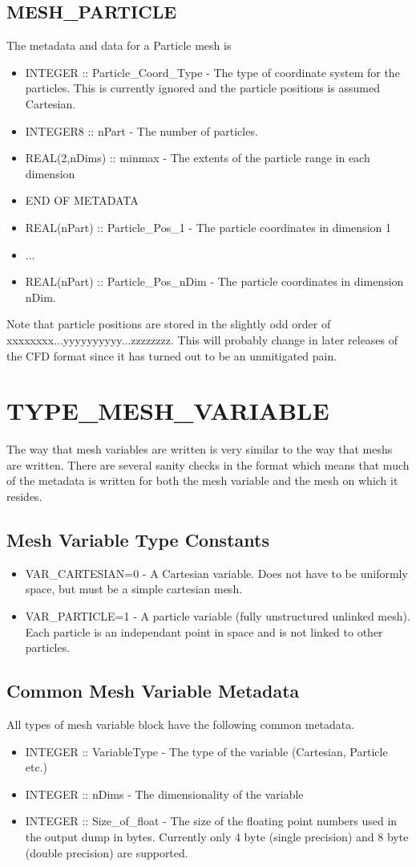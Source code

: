 \documentclass[8pt]{article}
\begin{document}
\subsection{MESH\_PARTICLE}
The metadata and data for a Particle mesh is
\begin{itemize}
\item INTEGER :: Particle\_Coord\_Type - The type of coordinate system for the particles. This is currently ignored and the particle positions is assumed Cartesian.
\item INTEGER8 :: nPart - The number of particles.
\item REAL(2,nDims) :: minmax - The extents of the particle range in each dimension
\item END OF METADATA
\item REAL(nPart) :: Particle\_Pos\_1 - The particle coordinates in dimension 1
\item ...
\item REAL(nPart) :: Particle\_Pos\_nDim - The particle coordinates in dimension nDim.
\end{itemize}
Note that particle positions are stored in the slightly odd order of xxxxxxxx...yyyyyyyyyy...zzzzzzzz. This will probably change in later releases of the CFD format since it has turned out to be an unmitigated pain.

\section{TYPE\_MESH\_VARIABLE}
The way that mesh variables are written is very similar to the way that meshs are written. There are several sanity checks in the format which means that much of the metadata is written for both the mesh variable and the mesh on which it resides.
\subsection{Mesh Variable Type Constants}
\begin{itemize}
\item VAR\_CARTESIAN=0 - A Cartesian variable. Does not have to be uniformly space, but must be a simple cartesian mesh.
\item VAR\_PARTICLE=1 - A particle variable (fully unstructured unlinked mesh). Each particle is an independant point in space and is not linked to other particles.
\end{itemize}
\subsection{Common Mesh Variable Metadata}
All types of mesh variable block have the following common metadata.
\begin{itemize}
  \item INTEGER :: VariableType - The type of the variable (Cartesian, Particle etc.)
  \item INTEGER :: nDims - The dimensionality of the variable
  \item INTEGER :: Size\_of\_float - The size of the floating point numbers used in the output dump in bytes. Currently only 4 byte (single precision) and 8 byte (double precision) are supported.
\end{itemize}
\end{document}
